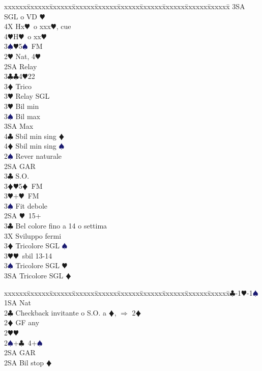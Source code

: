 \documentclass[a4paper,italian]{article}
\newcommand{\BC}{\textcolor{OliveGreen}{$\clubsuit$}}
\newcommand{\BD}{\textcolor{RedOrange}{$\vardiamondsuit$}}
\newcommand{\BH}{\textcolor{Red2}{$\varheartsuit${}}}
\newcommand{\BS}{\textcolor{MidnightBlue}{$\spadesuit${}}}
\newenvironment{bidtable}
{\begin{tabbing}

    xxxxxx\=xxxxxx\=xxxxxx\=xxxxxx\=xxxxxx\=xxxxxx\=xxxxxx\=xxxxxx\=xxxxxx\=xxxxxx\=\kill}
{\end{tabbing} }%
\begin{document}
\begin{multicols}{2}
\begin{bidtable}
        3SA SGL o VD \BH\\
        4X Hx\BH\ o xxx\BH, cue\\
        4\BH H\BH\ o xx\BH\-\\
        3\BS {}\BH 5\BS\ FM\-\\
        2\BH \> Nat, 4\BH \+\\
        2SA \> Relay\+\\
        3\BC {}\BC 4\BH 22\\
        3\BD \> Trico\+\\
        3\BH \> Relay SGL\-\\
        3\BH \> Bil min\\
        3\BS \> Bil max\\
        3SA  Max\\
        4\BC \> Sbil min sing \BD \\
        4\BD \> Sbil min sing \BS \-\-\\
        2\BS \> Rever naturale\+\\
        2SA \> GAR\\
        3\BC \> S.O.\\
        3\BD {}\BH 5\BD\ FM\\
        3\BH {}+\BH\ FM\\
        3\BS \> Fit debole\-\\
        2SA \BH\ 15+\\
        3\BC \> Bel colore fino a 14 o settima\+\\
        3X \> Sviluppo fermi\-\\
        3\BD \> Tricolore SGL \BS \\
        3\BH {}\BH\ sbil 13-14\\
        3\BS \> Tricolore SGL \BH \\
        3SA \> Tricolore SGL \BD \-
    \end{bidtable}
    \bigbreak
    \begin{bidtable}
        1\BC-1\BH-1\BS\+\\
        1SA \> Nat\\
        2\BC \> Checkback invitante o S.O. a \BD , $\Rightarrow$ 2\BD \\
        2\BD \> GF any\+\\
        2\BH {}\BH \\
        2\BS {}+\BC\ 4+\BS \+\\
        2SA \> GAR\-\\
        2SA \> Bil stop \BD \\

\end{bidtable}
\end{multicols}
\end{document}
